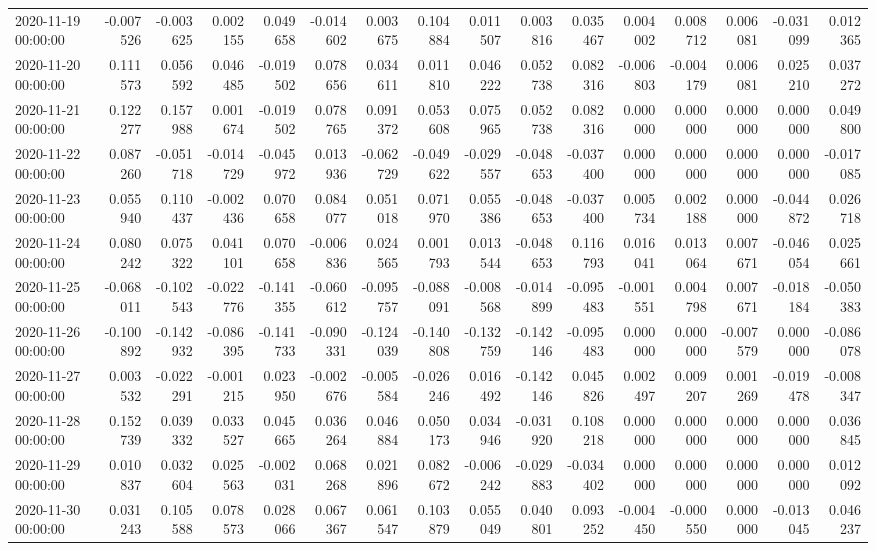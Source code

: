 \begin{tabular}{lrrrrrrrrrrrrrrr}
2020-11-19 00:00:00 & -0.007526 & -0.003625 & 0.002155 & 0.049658 & -0.014602 & 0.003675 & 0.104884 & 0.011507 & 0.003816 & 0.035467 & 0.004002 & 0.008712 & 0.006081 & -0.031099 & 0.012365 \\
2020-11-20 00:00:00 & 0.111573 & 0.056592 & 0.046485 & -0.019502 & 0.078656 & 0.034611 & 0.011810 & 0.046222 & 0.052738 & 0.082316 & -0.006803 & -0.004179 & 0.006081 & 0.025210 & 0.037272 \\
2020-11-21 00:00:00 & 0.122277 & 0.157988 & 0.001674 & -0.019502 & 0.078765 & 0.091372 & 0.053608 & 0.075965 & 0.052738 & 0.082316 & 0.000000 & 0.000000 & 0.000000 & 0.000000 & 0.049800 \\
2020-11-22 00:00:00 & 0.087260 & -0.051718 & -0.014729 & -0.045972 & 0.013936 & -0.062729 & -0.049622 & -0.029557 & -0.048653 & -0.037400 & 0.000000 & 0.000000 & 0.000000 & 0.000000 & -0.017085 \\
2020-11-23 00:00:00 & 0.055940 & 0.110437 & -0.002436 & 0.070658 & 0.084077 & 0.051018 & 0.071970 & 0.055386 & -0.048653 & -0.037400 & 0.005734 & 0.002188 & 0.000000 & -0.044872 & 0.026718 \\
2020-11-24 00:00:00 & 0.080242 & 0.075322 & 0.041101 & 0.070658 & -0.006836 & 0.024565 & 0.001793 & 0.013544 & -0.048653 & 0.116793 & 0.016041 & 0.013064 & 0.007671 & -0.046054 & 0.025661 \\
2020-11-25 00:00:00 & -0.068011 & -0.102543 & -0.022776 & -0.141355 & -0.060612 & -0.095757 & -0.088091 & -0.008568 & -0.014899 & -0.095483 & -0.001551 & 0.004798 & 0.007671 & -0.018184 & -0.050383 \\
2020-11-26 00:00:00 & -0.100892 & -0.142932 & -0.086395 & -0.141733 & -0.090331 & -0.124039 & -0.140808 & -0.132759 & -0.142146 & -0.095483 & 0.000000 & 0.000000 & -0.007579 & 0.000000 & -0.086078 \\
2020-11-27 00:00:00 & 0.003532 & -0.022291 & -0.001215 & 0.023950 & -0.002676 & -0.005584 & -0.026246 & 0.016492 & -0.142146 & 0.045826 & 0.002497 & 0.009207 & 0.001269 & -0.019478 & -0.008347 \\
2020-11-28 00:00:00 & 0.152739 & 0.039332 & 0.033527 & 0.045665 & 0.036264 & 0.046884 & 0.050173 & 0.034946 & -0.031920 & 0.108218 & 0.000000 & 0.000000 & 0.000000 & 0.000000 & 0.036845 \\
2020-11-29 00:00:00 & 0.010837 & 0.032604 & 0.025563 & -0.002031 & 0.068268 & 0.021896 & 0.082672 & -0.006242 & -0.029883 & -0.034402 & 0.000000 & 0.000000 & 0.000000 & 0.000000 & 0.012092 \\
2020-11-30 00:00:00 & 0.031243 & 0.105588 & 0.078573 & 0.028066 & 0.067367 & 0.061547 & 0.103879 & 0.055049 & 0.040801 & 0.093252 & -0.004450 & -0.000550 & 0.000000 & -0.013045 & 0.046237 \\

\end{tabular}
